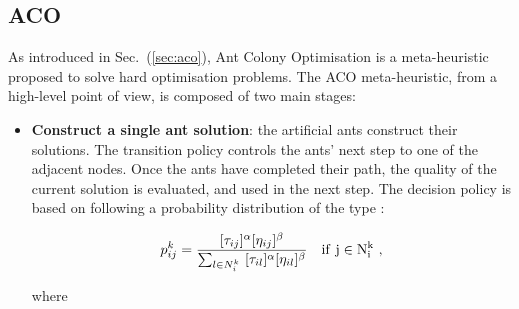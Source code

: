 \documentclass[10pt]{article}
\begin{document}
\subsection{ACO}
As introduced in Sec.~(\ref{sec:aco}), Ant Colony Optimisation is a meta-heuristic proposed to solve hard optimisation problems. 
The ACO meta-heuristic, from a high-level point of view, is composed of two main stages:
\begin{itemize}
\item \textbf{Construct a single ant solution}:
the  artificial  ants  construct  their  solutions.  The transition policy controls  the  ants’  next step to one of the adjacent nodes. Once the ants have completed  their  path,  the quality  of  the current solution is evaluated,  and used in the next step. 
The decision policy is based on following a probability distribution of the type \cite{cinque}:

\begin{equation}
p_{ij}^k=  \frac{[\tau_{ij}]^{\alpha}[\eta_{ij}]^{\beta}}{\sum_{l \in N_i^k} ~  [\tau_{il}]^{\alpha}[\eta_{il}]^{\beta}} ~~~\rm{if} ~j \in N_i^k ~,
\label{eq:prob-aco}
\end{equation}

where 
\begin{itemize}


\end{itemize}
\end{itemize}
\end{document}
